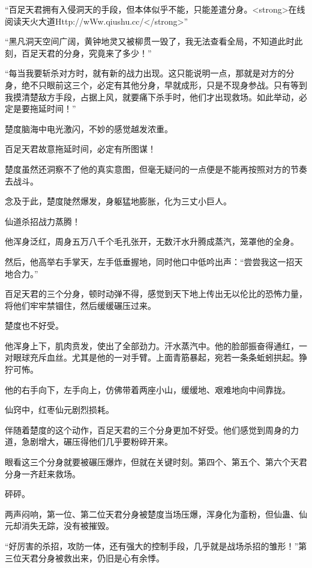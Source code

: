 
\begin{this_body}

“百足天君拥有入侵洞天的手段，但本体似乎不能，只能差遣分身。<strong>在线阅读天火大道Http://wWw.qiushu.cc/</strong>”

“黑凡洞天空间广阔，黄钟地灵又被柳贯一毁了，我无法查看全局，不知道此时此刻，百足天君的分身，究竟来了多少！”

“每当我要斩杀对方时，就有新的战力出现。这只能说明一点，那就是对方的分身，绝不只眼前这三个，必定有其他分身，早就成形，只是不现身参战。只有等到我摸清楚敌方手段，占据上风，就要痛下杀手时，他们才出现救场。如此举动，必定是要拖延时间！”

楚度脑海中电光激闪，不妙的感觉越发浓重。

百足天君故意拖延时间，必定有所图谋！

楚度虽然还洞察不了他的真实意图，但毫无疑问的一点便是不能再按照对方的节奏去战斗。

念及于此，楚度陡然爆发，身躯猛地膨胀，化为三丈小巨人。

仙道杀招战力蒸腾！

他浑身泛红，周身五万八千个毛孔张开，无数汗水升腾成蒸汽，笼罩他的全身。

然后，他高举右手掌天，左手低垂握地，同时他口中低吟出声：“尝尝我这一招天地合力。”

百足天君的三个分身，顿时动弹不得，感觉到天下地上传出无以伦比的恐怖力量，将他们牢牢禁锢住，然后缓缓碾压过来。

楚度也不好受。

他浑身上下，肌肉贲发，使出了全部劲力。汗水蒸汽中。他的脸部振奋得通红，一对眼球充斥血丝。尤其是他的一对手臂。上面青筋暴起，宛若一条条蚯蚓拱起。狰狞可怖。

他的右手向下，左手向上，仿佛带着两座小山，缓缓地、艰难地向中间靠拢。

仙窍中，红枣仙元剧烈损耗。

伴随着楚度的这个动作，百足天君的三个分身更加不好受。他们感觉到周身的力道，急剧增大，碾压得他们几乎要粉碎开来。

眼看这三个分身就要被碾压爆炸，但就在关键时刻。第四个、第五个、第六个天君分身一齐赶来救场。

砰砰。

两声闷响，第一位、第二位天君分身被楚度当场压爆，浑身化为齑粉，但仙蛊、仙元却消失无踪，没有被摧毁。

“好厉害的杀招，攻防一体，还有强大的控制手段，几乎就是战场杀招的雏形！”第三位天君分身被救出来，仍旧是心有余悸。


\end{this_body}
